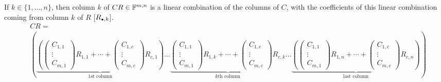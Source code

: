 \begin{thm}
   If $k \in \{1,\ldots,n\}$, then column $k$ of $CR\in \mathbb{F}^{m,n}$ is a linear combination of the columns of $C$, with the coefficients of this linear combination coming from column $k$ of $R$ [$R_{\mathsmaller{\bullet}, k}$].
  \begin{equation}
    \begin{aligned}
      &CR = \\
      &\left(
      \underbrace{
      \left(
       \left(
          \begin{matrix}C_{1,1}
            \\ \vdots \\ C_{m,1}
          \end{matrix}
        \right) R_{1,1}
        + \cdots +
        \left(
          \begin{matrix}C_{1,c}
            \\ \vdots \\ C_{m,c}
          \end{matrix}
        \right) R_{c,1}
        \right)
      }_{\text{$1$st column}}
      \ldots
      \underbrace{
        \boxed{
          \left(
            \begin{matrix}C_{1,1}
              \\ \vdots \\ C_{m,1}
            \end{matrix}
          \right) R_{1,k}
          + \cdots +
          \left(
            \begin{matrix}C_{1,c}
              \\ \vdots \\ C_{m,c}
            \end{matrix}
          \right) R_{c,k}
        }
      }_{\text{$k$th column}}
      \ldots
      \underbrace{
        \left(
          \left(
            \begin{matrix}C_{1,1}
              \\ \vdots \\ C_{m,1}
            \end{matrix}
          \right) R_{1,n}
          + \cdots +
          \left(
            \begin{matrix}C_{1,c}
              \\ \vdots \\ C_{m,c}
            \end{matrix}
          \right) R_{c,n}
        \right)
      }_{\text{last column}}
      \right)
    \end{aligned}
  \end{equation}


\end{thm}
